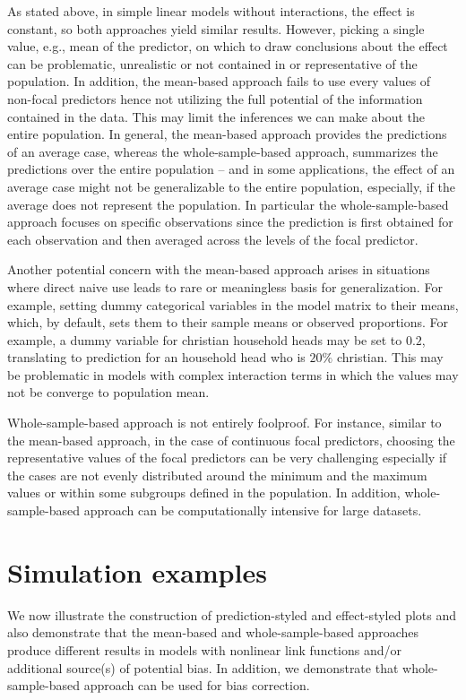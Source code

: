 As stated above, in simple linear models without interactions, the effect is constant, so both approaches yield similar results. However, picking a single value, e.g., mean of the predictor, on which to draw conclusions about the effect can be problematic, unrealistic or not contained in or representative of the population. In addition, the mean-based approach fails to use every values of non-focal predictors hence not utilizing the full potential of the information contained in the data. This may limit the inferences we can make about the entire population. In general, the mean-based approach provides the predictions of an average case, whereas the whole-sample-based approach, summarizes the predictions over the entire population -- and in some applications, the effect of an average case might not be generalizable to the entire population, especially, if the average does not represent the population. In particular the whole-sample-based approach focuses on specific observations since the prediction is first obtained for each observation and then averaged across the levels of the focal predictor.

Another potential concern with the mean-based approach arises in situations where direct naive use leads to rare or meaningless basis for generalization. For example, setting dummy categorical variables in the model matrix to their means, which, by default, sets them to their sample means or observed proportions. For example, a dummy variable for christian household heads may be set to $0.2$, translating to prediction for an household head who is $20\%$ christian. This may be problematic in models with complex interaction terms in which the values may not be converge to population mean\citep{hanmer2013behind}.

Whole-sample-based approach is not entirely foolproof. For instance, similar to the mean-based approach, in the case of continuous focal predictors, choosing the representative values of the focal predictors can be very challenging especially if the cases are not evenly distributed around the minimum and the maximum values or within some subgroups defined in the population. In addition, whole-sample-based approach can be computationally intensive for large datasets.

\section{Simulation examples}

We now illustrate the construction of prediction-styled and effect-styled plots and also demonstrate that the mean-based and whole-sample-based approaches produce different results in models with nonlinear link functions and/or additional source(s) of potential bias. In addition, we demonstrate that whole-sample-based approach can be used for bias correction.

